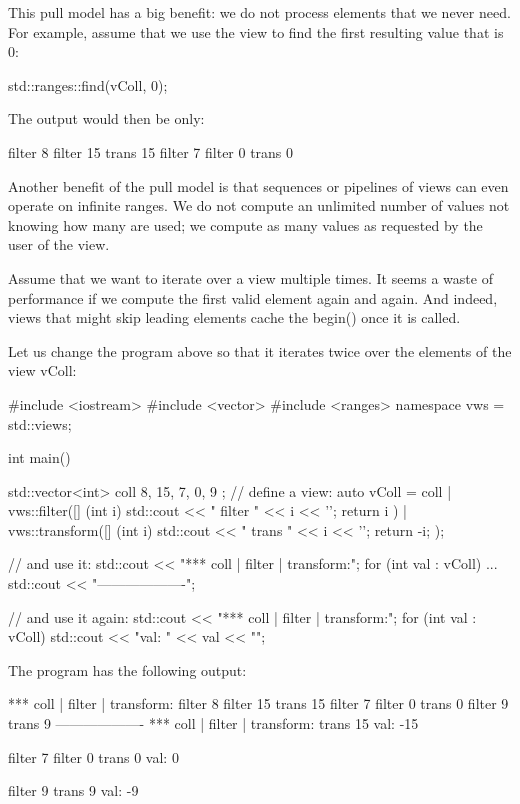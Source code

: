 This pull model has a big benefit: we do not process elements that we never need. For example, assume that we use the view to find the first resulting value that is 0:

\begin{cpp}
std::ranges::find(vColl, 0);
\end{cpp}

The output would then be only:

{\footnotesize
\begin{shell}
filter 8
filter 15
trans 15
filter 7
filter 0
trans 0
\end{shell}
}

Another benefit of the pull model is that sequences or pipelines of views can even operate on infinite ranges. We do not compute an unlimited number of values not knowing how many are used; we compute as many values as requested by the user of the view.


Assume that we want to iterate over a view multiple times. It seems a waste of performance if we compute the first valid element again and again. And indeed, views that might skip leading elements cache the begin() once it is called.

Let us change the program above so that it iterates twice over the elements of the view vColl:


\begin{cpp}
#include <iostream>
#include <vector>
#include <ranges>
namespace vws = std::views;

int main()
{
	std::vector<int> coll{ 8, 15, 7, 0, 9 };
	// define a view:
	auto vColl = coll
	| vws::filter([] (int i) {
		std::cout << " filter " << i << '\n';
		return i %
	})
	| vws::transform([] (int i) {
		std::cout << " trans " << i << '\n';
		return -i;
	});
	
	// and use it:
	std::cout << "*** coll | filter | transform:\n";
	for (int val : vColl) {
		...
	}
	std::cout << "-------------------\n";
	
	// and use it again:
	std::cout << "*** coll | filter | transform:\n";
	for (int val : vColl) {
		std::cout << "val: " << val << "\n\n";
	}
}
\end{cpp}

The program has the following output:

{\footnotesize
\begin{shell}
*** coll | filter | transform:
filter 8
filter 15
trans 15
filter 7
filter 0
trans 0
filter 9
trans 9
-------------------
*** coll | filter | transform:
trans 15
val: -15

filter 7
filter 0
trans 0
val: 0

filter 9
trans 9
val: -9
\end{shell}
}


